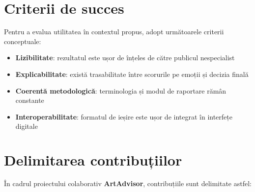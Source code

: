 \section{Criterii de succes}
\label{sec:intro-criterii}

Pentru a evalua utilitatea în contextul propus, adopt următoarele criterii conceptuale:

\begin{itemize}
  \item \textbf{Lizibilitate}: rezultatul este ușor de înțeles de către publicul nespecialist
  \item \textbf{Explicabilitate}: există trasabilitate între scorurile pe emoții și decizia finală
  \item \textbf{Coerentă metodologică}: terminologia și modul de raportare rămân constante
  \item \textbf{Interoperabilitate}: formatul de ieșire este ușor de integrat în interfețe digitale
\end{itemize}

\section{Delimitarea contribuțiilor}
\label{sec:intro-contributii}

În cadrul proiectului colaborativ \textbf{ArtAdvisor}, contribuțiile sunt delimitate astfel:

